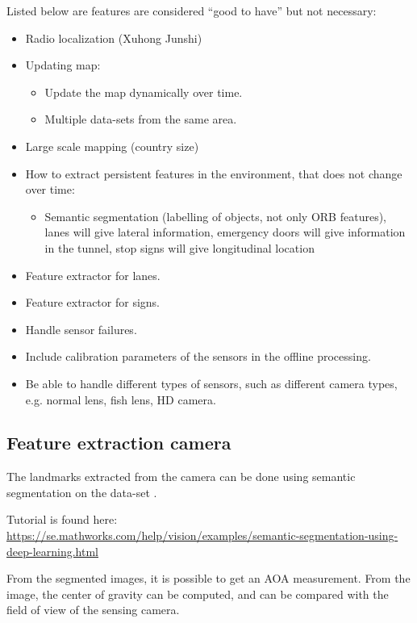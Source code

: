 Listed below are features are considered ``good to have'' but not
necessary:

\begin{itemize}
\item Radio localization  (Xuhong  Junshi)
\item Updating map:
  \begin{itemize}
  \item Update the map dynamically over time.
  \item Multiple data-sets from the same area.
  \end{itemize}
\item Large scale mapping (country size)
\item How to extract persistent features in the environment, that does
  not change over time:
  \begin{itemize}
  \item  Semantic segmentation (labelling of objects, not only ORB
    features), lanes will give lateral information, emergency doors
    will give information in the tunnel, stop signs will give
    longitudinal location
  \end{itemize}
\item Feature extractor for lanes.
\item Feature extractor for signs.
\item Handle sensor failures.
\item Include calibration parameters of the sensors in the offline processing.
\item Be able to handle different types of sensors, such as different camera types, e.g. normal lens, fish lens, HD camera.
\end{itemize}

\subsection{Feature extraction camera}

The landmarks extracted from the camera can be done using semantic
segmentation on the data-set \cite{Brostow:2009:SOC:1464534.1465403}.

Tutorial is found here:
\url{https://se.mathworks.com/help/vision/examples/semantic-segmentation-using-deep-learning.html}

From the segmented images, it is possible to get an \gls{AOA}
measurement. From the image, the center of gravity can be computed,
and can be compared with the field of view of the sensing camera.

